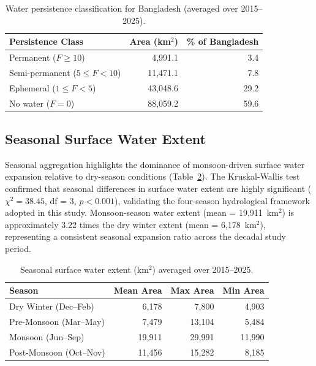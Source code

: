 \documentclass[fleqn,10pt]{article}
\begin{document}
\begin{table}[H]
\centering
\caption{Water persistence classification for Bangladesh (averaged over 2015--2025).}
\label{tab:persistence}
\begin{tabular}{lrr}
\toprule
\textbf{Persistence Class} & \textbf{Area (km$^{2}$)} & \textbf{\% of Bangladesh} \\
\midrule
Permanent ($F \geq 10$)         & 4,991.1 & 3.4 \\
Semi-permanent ($5 \leq F < 10$) & 11,471.1  & 7.8  \\
Ephemeral ($1 \leq F < 5$)      & 43,048.6 & 29.2 \\
No water ($F = 0$)              & 88,059.2 & 59.6 \\
\bottomrule
\end{tabular}
\end{table}



\subsection{Seasonal Surface Water Extent}

Seasonal aggregation highlights the dominance of monsoon-driven surface water expansion relative to dry-season conditions (Table~\ref{tab:seasonal}). The Kruskal-Wallis test confirmed that seasonal differences in surface water extent are highly significant ($\chi^2 = 38.45$, df = 3, $p < 0.001$), validating the four-season hydrological framework adopted in this study. Monsoon-season water extent (mean = 19,911~km$^2$) is approximately 3.22 times the dry winter extent (mean = 6,178~km$^2$), representing a consistent seasonal expansion ratio across the decadal study period.

\begin{table}[H]
\centering
\caption{Seasonal surface water extent (km$^{2}$) averaged over 2015--2025.}
\label{tab:seasonal}
\begin{tabular}{lrrr}
\toprule
\textbf{Season} & \textbf{Mean Area} & \textbf{Max Area} & \textbf{Min Area} \\
\midrule
Dry Winter (Dec--Feb)     & 6,178 & 7,800 & 4,903 \\
Pre-Monsoon (Mar--May)    & 7,479 & 13,104 & 5,484 \\
Monsoon (Jun--Sep)        & 19,911 & 29,991 & 11,990 \\
Post-Monsoon (Oct--Nov)   & 11,456 & 15,282 & 8,185 \\
\bottomrule
\end{tabular}
\end{table}
\end{document}
